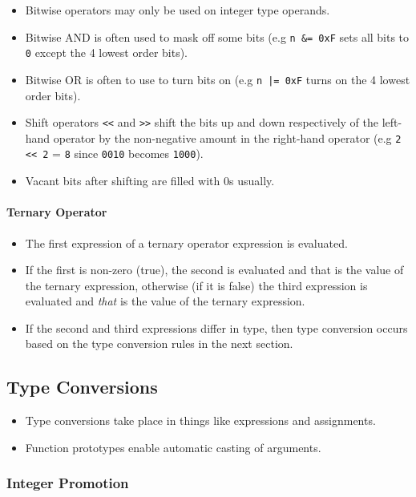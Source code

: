 \documentclass{article}
\newcommand{\code}[1]{\texttt{#1}}
\begin{document}
\begin{itemize}
    \item Bitwise operators may only be used on integer type operands.
    \item Bitwise AND is often used to mask off some bits (e.g \code{n \&= 0xF} sets all bits to \code{0} except the 4 lowest order bits).
    \item Bitwise OR is often to use to turn bits on (e.g \code{n |= 0xF} turns on the 4 lowest order bits).
    \item Shift operators \code{<<} and \code{>>} shift the bits up and down respectively of the left-hand operator by the non-negative amount in the right-hand operator (e.g \code{2 << 2} = \code{8} since \code{0010} becomes \code{1000}).
    \item Vacant bits after shifting are filled with 0s usually.
\end{itemize}

\paragraph{Ternary Operator}

\begin{itemize}
    \item The first expression of a ternary operator expression is evaluated.
    \item If the first is non-zero (true), the second is evaluated and that is the value of the ternary expression, otherwise (if it is false) the third expression is evaluated and \emph{that} is the value of the ternary expression.
    \item If the second and third expressions differ in type, then type conversion occurs based on the type conversion rules in the next section.
\end{itemize}

\subsection{Type Conversions}

\begin{itemize}
    \item Type conversions take place in things like expressions and assignments.
    \item Function prototypes enable automatic casting of arguments.
\end{itemize}

\subsubsection{Integer Promotion}
\end{document}
